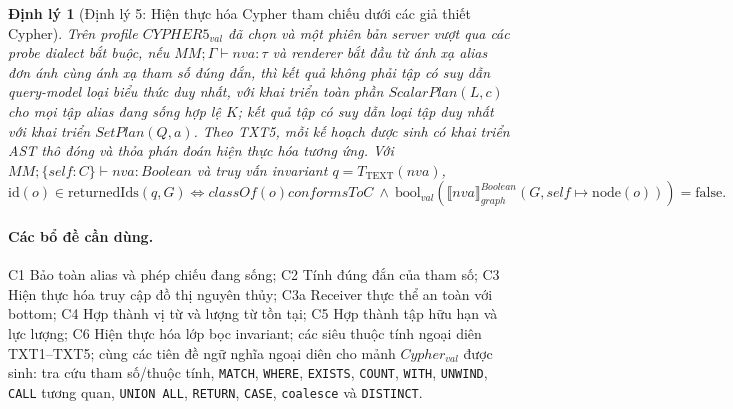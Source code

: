\documentclass[11pt,a4paper]{article}
\newtheorem{theorem}{Định lý}
\theoremstyle{definition}
\newcommand{\id}{\mathrm{id}}
\newcommand{\node}{\mathrm{node}}
\newcommand{\boolval}{\mathrm{bool}_{val}}
\newcommand{\returnedIds}{\mathrm{returnedIds}}
\newcommand{\sem}[2]{\llbracket #1 \rrbracket_{#2}}
\begin{document}
\begin{theorem}[Định lý 5: Hiện thực hóa Cypher tham chiếu dưới các giả thiết Cypher]
Trên profile $CYPHER5_{val}$ đã chọn và một phiên bản server vượt qua các probe
dialect bắt buộc, nếu $MM;\Gamma\vdash nva:\tau$ và renderer bắt đầu từ ánh xạ
alias đơn ánh cùng ánh xạ tham số đúng đắn, thì kết quả không phải tập có suy
dẫn query-model loại biểu thức duy nhất, với khai triển toàn phần
$ScalarPlan(L,c)$ cho mọi tập alias đang sống hợp lệ $K$; kết quả tập có suy dẫn
loại tập duy nhất với khai triển $SetPlan(Q,a)$. Theo TXT5, mỗi kế hoạch được
sinh có khai triển AST thô đóng và thỏa phán đoán hiện thực hóa tương ứng. Với
$MM;\{self:C\}\vdash nva:Boolean$ và truy vấn invariant
$q=T_{\mathrm{TEXT}}(nva)$,
\[
\id(o)\in \returnedIds(q,G)
\iff
classOf(o)\mathrel{conformsTo}C\ \land\
\boolval(\sem{nva}{graph}^{Boolean}(G,self\mapsto \node(o)))=\mathrm{false}.
\]
\end{theorem}

\paragraph{Các bổ đề cần dùng.}
C1 Bảo toàn alias và phép chiếu đang sống; C2 Tính đúng đắn của tham số; C3
Hiện thực hóa truy cập đồ thị nguyên thủy; C3a Receiver thực thể an toàn với
bottom; C4 Hợp thành vị từ và lượng từ tồn tại; C5 Hợp thành tập hữu hạn và lực
lượng; C6 Hiện thực hóa lớp bọc invariant; các siêu thuộc tính ngoại diên
TXT1--TXT5; cùng các tiên đề ngữ nghĩa ngoại diên cho mảnh $Cypher_{val}$ được
sinh: tra cứu tham số/thuộc tính, \texttt{MATCH}, \texttt{WHERE},
\texttt{EXISTS}, \texttt{COUNT}, \texttt{WITH}, \texttt{UNWIND},
\texttt{CALL} tương quan, \texttt{UNION ALL}, \texttt{RETURN}, \texttt{CASE},
\texttt{coalesce} và \texttt{DISTINCT}.
\end{document}
